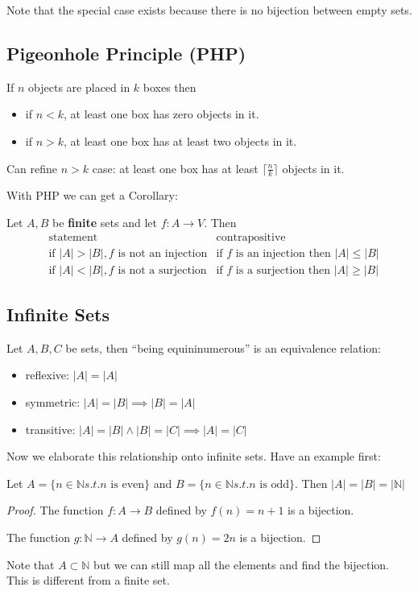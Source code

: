 \documentclass[letterpaper,12pt]{article}
\begin{document}
Note that the special case exists because there is no bijection between empty sets. 
\subsection{Pigeonhole Principle (PHP)}
If $n$ objects are placed in $k$ boxes then\begin{itemize}
    \item if $n<k$, at least one box has zero objects in it.
    \item if $n>k$, at least one box has at least two objects in it.
\end{itemize}
Can refine $n>k$ case: at least one box has at least $\lceil \frac{n}{k} \rceil$ objects in it. 

With PHP we can get a Corollary:

Let $A,B$ be \textbf{finite} sets and let $f:A\to V$. Then\begin{align*}
&\text{statement} &\text{contrapositive}\\
&\text{if } |A|>|B|,f\text{ is not an injection} & \text{if } f \text{ is an injection then }|A|\le |B|\\
&\text{if } |A|<|B|,f\text{ is not a surjection} & \text{if } f \text{ is a surjection then }|A|\ge |B|
\end{align*}


\subsection{Infinite Sets}
Let $A, B ,C$ be sets, then ``being equininumerous'' is an equivalence relation:\begin{itemize}
    \item reflexive: $|A|=|A|$
    \item symmetric: $|A|=|B|\implies |B|=|A|$
    \item transitive: $|A|=|B|\land |B|=|C|\implies |A|=|C|$
\end{itemize}

Now we elaborate this relationship onto infinite sets. Have an example first:

Let $A=\{n\in\mathbb{N}s.t.n \text{ is even}\}$ and $B=\{n\in\mathbb{N}s.t.n \text{ is odd}\}$. Then $|A|=|B|=|\mathbb{N}|$ \begin{proof}
    The function $f: A \to B$ defined by $f(n)=n+1$ is a bijection.

    The function $g: \mathbb{N} \to A$ defined by $g(n)=2n$ is a bijection.
\end{proof}
Note that $A\subset \mathbb{N}$ but we can still map all the elements and find the bijection. This is different from a finite set. 
\end{document}
